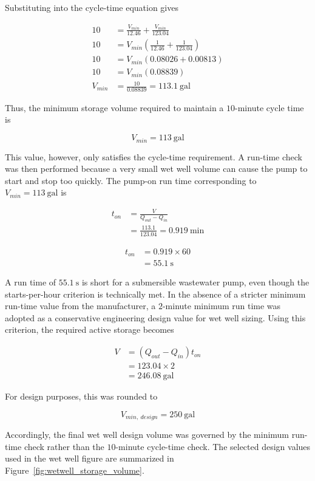 Substituting into the cycle-time equation gives

\[
\begin{aligned}
10 &= \frac{V_{min}}{12.46}+\frac{V_{min}}{123.04} \\
10 &= V_{min}\left(\frac{1}{12.46}+\frac{1}{123.04}\right) \\
10 &= V_{min}(0.08026+0.00813) \\
10 &= V_{min}(0.08839) \\
V_{min} &= \frac{10}{0.08839}=113.1~\text{gal}
\end{aligned}
\]

Thus, the minimum storage volume required to maintain a $10$-minute cycle time is

\[
\boxed{V_{min}=113~\text{gal}}
\]

This value, however, only satisfies the cycle-time requirement. A run-time check was then performed because a very small wet well volume can cause the pump to start and stop too quickly. The pump-on run time corresponding to $V_{min}=113~\text{gal}$ is

\[
\begin{aligned}
t_{on} &= \frac{V}{Q_{out}-Q_{in}} \\
&= \frac{113.1}{123.04}=0.919~\text{min}
\end{aligned}
\]

\[
\begin{aligned}
t_{on} &= 0.919\times 60 \\
&= 55.1~\text{s}
\end{aligned}
\]

A run time of $55.1~\text{s}$ is short for a submersible wastewater pump, even though the starts-per-hour criterion is technically met. In the absence of a stricter minimum run-time value from the manufacturer, a $2$-minute minimum run time was adopted as a conservative engineering design value for wet well sizing. Using this criterion, the required active storage becomes

\[
\begin{aligned}
V &= (Q_{out}-Q_{in})t_{on} \\
&= 123.04\times 2 \\
&= 246.08~\text{gal}
\end{aligned}
\]

For design purposes, this was rounded to

\[
\boxed{V_{min,\ design}=250~\text{gal}}
\]

Accordingly, the final wet well design volume was governed by the minimum run-time check rather than the $10$-minute cycle-time check. The selected design values used in the wet well figure are summarized in Figure~\ref{fig:wetwell_storage_volume}.

